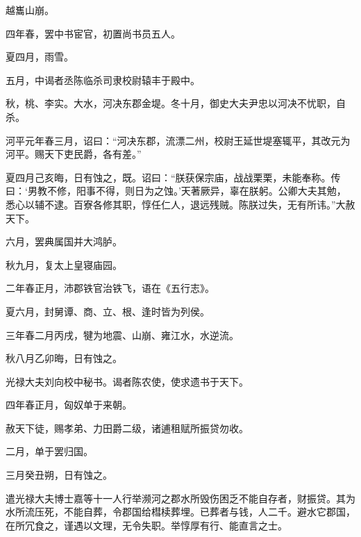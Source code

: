 \documentclass[12pt,UTF8]{ctexbook}
\begin{document}
越巂山崩。



四年春，罢中书宦官，初置尚书员五人。



夏四月，雨雪。



五月，中谒者丞陈临杀司隶校尉辕丰于殿中。



秋，桃、李实。大水，河决东郡金堤。冬十月，御史大夫尹忠以河决不忧职，自杀。



河平元年春三月，诏曰：“河决东郡，流漂二州，校尉王延世堤塞辄平，其改元为河平。赐天下吏民爵，各有差。”



夏四月己亥晦，日有蚀之，既。诏曰：“朕获保宗庙，战战栗栗，未能奉称。传曰：‘男教不修，阳事不得，则日为之蚀。’天著厥异，辜在朕躬。公卿大夫其勉，悉心以辅不逮。百寮各修其职，惇任仁人，退远残贼。陈朕过失，无有所讳。”大赦天下。



六月，罢典属国并大鸿胪。



秋九月，复太上皇寝庙园。



二年春正月，沛郡铁官治铁飞，语在《五行志》。



夏六月，封舅谭、商、立、根、逢时皆为列侯。



三年春二月丙戌，犍为地震、山崩、雍江水，水逆流。



秋八月乙卯晦，日有蚀之。



光禄大夫刘向校中秘书。谒者陈农使，使求遗书于天下。



四年春正月，匈奴单于来朝。



赦天下徒，赐孝弟、力田爵二级，诸逋租赋所振贷勿收。



二月，单于罢归国。



三月癸丑朔，日有蚀之。



遣光禄大夫博士嘉等十一人行举濒河之郡水所毁伤困乏不能自存者，财振贷。其为水所流压死，不能自葬，令郡国给槥椟葬埋。已葬者与钱，人二千。避水它郡国，在所冗食之，谨遇以文理，无令失职。举惇厚有行、能直言之士。
\end{document}
